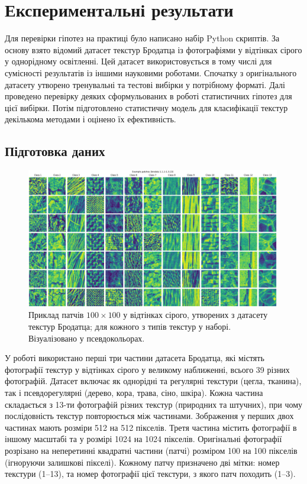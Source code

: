\section{Експериментальні результати}\label{section2.1}

Для перевірки гіпотез на практиці було написано набір Python скриптів.
За основу взято відомий датасет текстур Бродатца \cite{brodatz} із фотографіями у відтінках сірого у однорідному освітленні.
Цей датасет використовується в тому числі для сумісності результатів із іншими науковими роботами.
Спочатку з оригінального датасету утворено тренувальні та тестові вибірки у потрібному форматі.
Далі проведено перевірку деяких сформульованих в роботі статистичних гіпотез для цієї вибірки.
Потім підготовлено статистичну модель для класифікації текстур декількома методами і оцінено їх ефективність.

\subsection{Підготовка даних}\label{section2.1a}\hfill

\begin{figure}[h]
    \centering
    \includegraphics[width=0.99\textwidth]{img/example_classes.png}
    \caption{
        Приклад патчів $100\times 100$ у відтінках сірого, утворених з датасету текстур Бродатца; для кожного з типів текстур у наборі.
        Візуалізовано у псевдокольорах.
    }
    \label{fig:brodatz-showcase}
\end{figure}

У роботі використано перші три частини датасета Бродатца, які містять фотографії текстур у відтінках сірого у великому наближенні, всього 39 різних фотографій.
Датасет включає як однорідні та регулярні текстури (цегла, тканина), так і псевдорегулярні (дерево, кора, трава, сіно, шкіра). 
Кожна частина складається з 13-ти фотографій різних текстур (природних та штучних), при чому послідовність текстур повторюється між частинами. 
Зображення у перших двох частинах мають розміри 512 на 512 пікселів. 
Третя частина містить фотографії в іншому масштабі та у розмірі 1024 на 1024 пікселів.
Оригінальні фотографії розрізано на неперетинні квадратні частини (патчі) розміром 100 на 100 пікселів (ігноруючи залишкові пікселі).
Кожному патчу призначено дві мітки: номер текстури (1--13), та номер фотографії цієї текстури, з якого патч походить (1--3).

